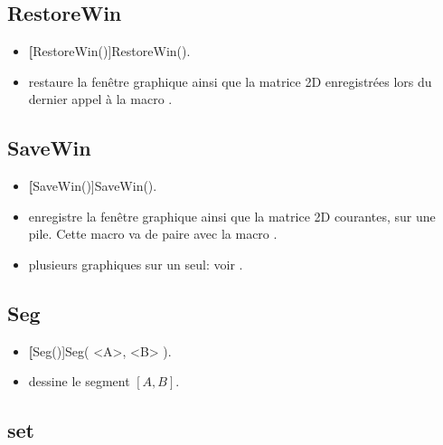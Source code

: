\subsection{RestoreWin}\label{macRestoreWin}

\begin{itemize}
 \item \util \textbf[RestoreWin()]{RestoreWin()}.
 \item \desc restaure la fenêtre graphique ainsi que la matrice 2D enregistrées lors du dernier appel à la macro .
\end{itemize}

\subsection{SaveWin}\label{macSaveWin}

\begin{itemize}
 \item \util \textbf[SaveWin()]{SaveWin()}.
 \item \desc enregistre la fenêtre graphique ainsi que la matrice 2D courantes, sur une pile. Cette macro va de paire avec la macro .
 \item \exem plusieurs graphiques sur un seul: voir .
\end{itemize}

\subsection{Seg}

\begin{itemize}
 \item \util \textbf[Seg()]{Seg( <A>, <B> )}.
 \item \desc dessine le segment $[A,B]$.
\end{itemize}

\subsection{set}\label{macset}

